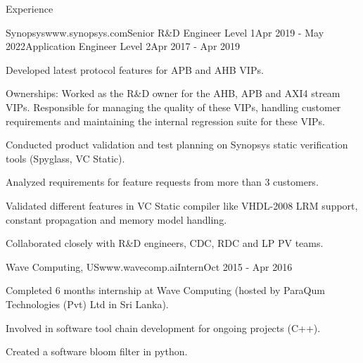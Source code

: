 \documentclass[
11pt, %
]{./assets/resume} %
\begin{document}
\begin{rSection}{Experience}
\begin{rSubsectionM}{Synopsys}{www.synopsys.com}{Senior R\&D Engineer Level 1}{Apr 2019 - May 2022}{Application Engineer Level 2}{Apr 2017 - Apr 2019}{}{}
		\item Developed latest protocol features for APB and AHB VIPs.
		\item Ownerships: Worked as the R\&D owner for the AHB, APB and AXI4 stream VIPs. Responsible for managing the quality of these VIPs, handling customer requirements and maintaining the internal regression suite for these VIPs.
		\item Conducted product validation and test planning on Synopsys static verification tools (Spyglass, VC Static).
		\item Analyzed requirements for feature requests from more than 3 customers.
		\item Validated different features in VC Static compiler like VHDL-2008 LRM support, constant propagation and memory model handling.
		\item Collaborated closely with R\&D engineers, CDC, RDC and LP PV teams.
	\end{rSubsectionM}
	\begin{rSubsectionX}{Wave Computing, US}{www.wavecomp.ai}{Intern}{Oct 2015 - Apr 2016}
		\item Completed 6 months internship at Wave Computing (hosted by ParaQum Technologies (Pvt) Ltd in Sri Lanka).
		\item Involved in software tool chain development for ongoing projects (C++).
		\item Created a software bloom filter in python.
	\end{rSubsectionX}
	
\end{rSection}


	
\end{document}
